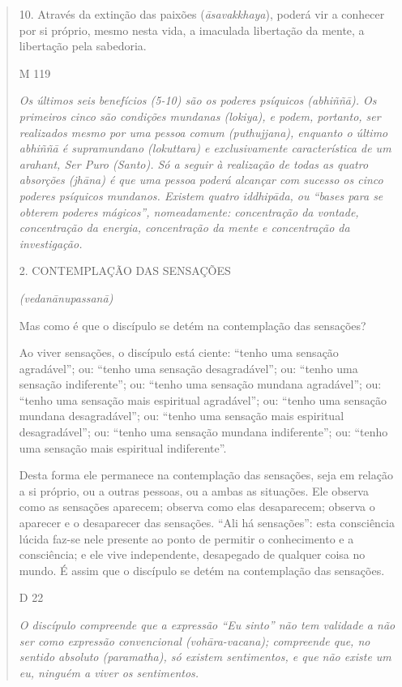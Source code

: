 \begin{quote}
10. Através da extinção das paixões (\emph{āsavakkhaya}), poderá vir a conhecer por si próprio, mesmo nesta vida, a imaculada libertação da mente, a libertação pela sabedoria.

M 119

\emph{Os últimos seis benefícios (5-10) são os poderes psíquicos (abhiññā). Os primeiros cinco são condições mundanas (lokiya), e podem, portanto, ser realizados mesmo por uma pessoa comum (puthujjana), enquanto o último abhiññā é supramundano (lokuttara) e exclusivamente característica de um arahant, Ser Puro (Santo). Só a seguir à realização de todas as quatro absorções (jhāna) é que uma pessoa poderá alcançar com sucesso os cinco poderes psíquicos mundanos. Existem quatro iddhipāda, ou ``bases para se obterem poderes mágicos'', nomeadamente: concentração da vontade, concentração da energia, concentração da mente e concentração da investigação.}

2. CONTEMPLAÇÃO DAS SENSAÇÕES

\emph{(vedanānupassanā)}

Mas como é que o discípulo se detém na contemplação das sensações?

Ao viver sensações, o discípulo está ciente: ``tenho uma sensação agradável''; ou: ``tenho uma sensação desagradável''; ou: ``tenho uma sensação indiferente''; ou: ``tenho uma sensação mundana agradável''; ou: ``tenho uma sensação mais espiritual agradável''; ou: ``tenho uma sensação mundana desagradável''; ou: ``tenho uma sensação mais espiritual desagradável''; ou: ``tenho uma sensação mundana indiferente''; ou: ``tenho uma sensação mais espiritual indiferente''.

Desta forma ele permanece na contemplação das sensações, seja em relação a si próprio, ou a outras pessoas, ou a ambas as situações. Ele observa como as sensações aparecem; observa como elas desaparecem; observa o aparecer e o desaparecer das sensações. ``Ali há sensações'': esta consciência lúcida faz-se nele presente ao ponto de permitir o conhecimento e a consciência; e ele vive independente, desapegado de qualquer coisa no mundo. É assim que o discípulo se detém na contemplação das sensações.

D 22

\emph{O discípulo compreende que a expressão ``Eu sinto'' não tem validade a não ser como expressão convencional (vohāra-vacana); compreende que, no sentido absoluto (paramatha), só existem sentimentos, e que não existe um eu, ninguém a viver os sentimentos.}


\end{quote}
